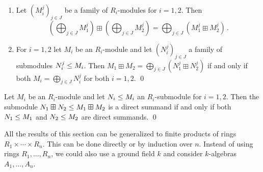 \begin{lemma}
  \leavevmode
  \begin{enumerate}
    \item
      Let $(M^j_i)_{j \in J}$ be a family of $R_i$-modules for $i = 1, 2$.
      Then
      \[
            \left( \bigoplus_{j \in J} M^j_1 \right) \boxplus \left( \bigoplus_{j \in J} M^j_2 \right)
          = \bigoplus_{j \in J} (M^j_1 \boxplus M^j_2) \,.
      \]
    \item
      For $i = 1, 2$ let $M_i$ be an $R_i$-module and let $(N^j_i)_{j \in J}$ a family of submodules $N^j_i \leq M_i$.
      Then $M_1 \boxplus M_2 = \bigoplus_{j \in J} (N^j_1 \boxplus N^j_2)$ if and only if both $M_i  = \bigoplus_{j \in J} N^j_i$ for both $i = 1, 2$.
    \qed
  \end{enumerate}
\end{lemma}


\begin{corollary}
  \label{corollary: direct summands for modules over products}
  Let $M_i$ be an $R_i$-module and let $N_i \leq M_i$ an $R_i$-submodule for $i = 1, 2$.
  Then the submodule $N_1 \boxplus N_2 \leq M_1 \boxplus M_2$ is a direct summand if and only if both $N_1 \leq M_1$ and $N_2 \leq M_2$ are direct summands.
  \qed
\end{corollary}


\begin{remark}
  All the results of this section can be generalized to finite products of rings $R_1 \times \dotsb \times R_n$.
  This can be done directly or by induction over $n$.
  Instead of using rings $R_1, \dotsc, R_n$, we could also use a ground field $k$ and consider $k$-algebras $A_1, \dotsc, A_n$.
\end{remark}




